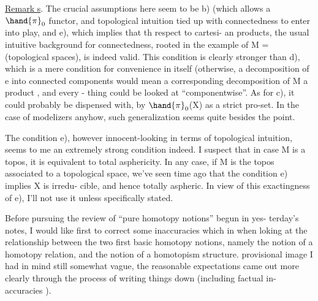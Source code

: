 
\uline{Remark s}. The crucial assumptions here seem to be b) (which allows \allowbreak{}
 a $\hand{\pi}_0$ functor, and topological intuition tied up with connectedness
to enter into play\hand{)}, and e), which implies that th respect to cartesi-%
an products, the usual intuitive background for connectedness, rooted in
the example of M = (topological spaces), is indeed valid. This condition
is clearly stronger than d), which is a mere condition for convenience
in itself (otherwise, a decomposition of e into connected components
would mean a corresponding decomposition of M  a product , and every -%
thing could be looked at ``componentwise''\hand{)}. As for c), it could probably
be dispensed with, by  $\hand{\pi}_0$(X) as a strict pro-set. In the
case of modelizers anyhow, such generalization seems quite besides the
point.

The condition e), however innocent-looking in terms of topological
intuition, seems to me an extremely strong condition indeed. I suspect
that in case M is a topos, it is equivalent to total asphericity. In any
case, if M is the topos associated to a  topological space, we've seen
time ago  that  the condition  e) implies X is irredu-%
cible, and hence totally aspheric. In view of this exactingness of e),
I'll not use it unless specifically stated.


 Before pursuing the review of ``pure homotopy notions'' begun in yes-%
terday's notes, I would like first to correct some inaccuracies which
 in when loking at the relationship between the two first basic
homotopy notions, namely the notion of a homotopy relation, and the 
notion of a homotopism structure.  
  provisional image I had in mind
 still somewhat vague,  the reasonable expectations came out more
clearly through the process of writing things down (including factual in-%
accuracies \hand{!}).

